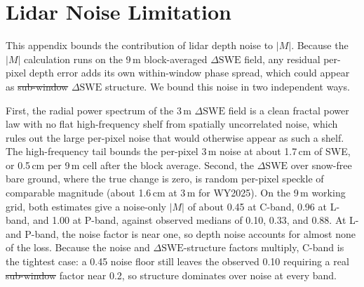 \documentclass[tc, manuscript]{copernicus}
\providecommand{\DIFadd}[1]{{\protect\color{blue}\uwave{#1}}} %
\providecommand{\DIFdel}[1]{{\protect\color{red}\sout{#1}}} %
\providecommand{\DIFaddbegin}{} %
\providecommand{\DIFaddend}{} %
\providecommand{\DIFdelbegin}{} %
\providecommand{\DIFdelend}{} %
\begin{document}









\appendix
\section{Lidar Noise Limitation}\label{appendix:noise}    %

This appendix bounds the contribution of lidar depth noise to $|M|$. Because the $|M|$ calculation runs on the 9\,\unit{m} block-averaged $\Delta\mathrm{SWE}$ field, any residual per-pixel depth error adds its own within-window phase spread, which could appear as \DIFdelbegin \DIFdel{sub-window }\DIFdelend \DIFaddbegin \DIFadd{within-window }\DIFaddend $\Delta\mathrm{SWE}$ structure. We bound this noise in two independent ways.

First, the radial power spectrum of the 3\,\unit{m} $\Delta\mathrm{SWE}$ field is a clean fractal power law with no flat high-frequency shelf from spatially uncorrelated noise, which rules out the large per-pixel noise that would otherwise appear as such a shelf. The high-frequency tail bounds the per-pixel 3\,\unit{m} noise at about 1.7\,\unit{cm} of SWE, or 0.5\,\unit{cm} per 9\,\unit{m} cell after the block average. Second, the $\Delta\mathrm{SWE}$ over snow-free bare ground, where the true change is zero, is random per-pixel speckle of comparable magnitude (about 1.6\,\unit{cm} at 3\,\unit{m} for WY2025). On the 9\,\unit{m} working grid, both estimates give a noise-only $|M|$ of about 0.45 at C-band, 0.96 at L-band, and 1.00 at P-band, against observed medians of 0.10, 0.33, and 0.88. At L- and P-band, the noise factor is near one, so depth noise accounts for almost none of the loss. Because the noise and $\Delta\mathrm{SWE}$-structure factors multiply, C-band is the tightest case: a 0.45 noise floor still leaves the observed 0.10 requiring a real \DIFdelbegin \DIFdel{sub-window }\DIFdelend \DIFaddbegin \DIFadd{within-window }\DIFaddend factor near 0.2, so structure dominates over noise at every band.
\end{document}
